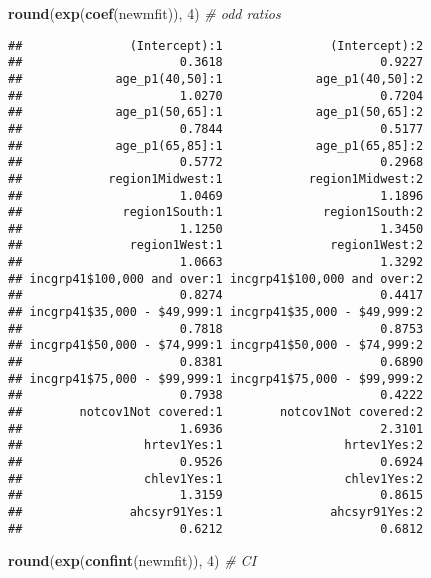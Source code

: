 \documentclass[]{article}
\newenvironment{Shaded}{\begin{snugshade}}{\end{snugshade}}
\newcommand{\CommentTok}[1]{\textcolor[rgb]{0.56,0.35,0.01}{\textit{#1}}}
\newcommand{\DecValTok}[1]{\textcolor[rgb]{0.00,0.00,0.81}{#1}}
\newcommand{\KeywordTok}[1]{\textcolor[rgb]{0.13,0.29,0.53}{\textbf{#1}}}
\newcommand{\NormalTok}[1]{#1}
\begin{document}
\begin{Shaded}
\begin{Highlighting}[]
\KeywordTok{round}\NormalTok{(}\KeywordTok{exp}\NormalTok{(}\KeywordTok{coef}\NormalTok{(newmfit)), }\DecValTok{4}\NormalTok{) }\CommentTok{# odd ratios}
\end{Highlighting}
\end{Shaded}

\begin{verbatim}
##               (Intercept):1               (Intercept):2 
##                      0.3618                      0.9227 
##             age_p1(40,50]:1             age_p1(40,50]:2 
##                      1.0270                      0.7204 
##             age_p1(50,65]:1             age_p1(50,65]:2 
##                      0.7844                      0.5177 
##             age_p1(65,85]:1             age_p1(65,85]:2 
##                      0.5772                      0.2968 
##            region1Midwest:1            region1Midwest:2 
##                      1.0469                      1.1896 
##              region1South:1              region1South:2 
##                      1.1250                      1.3450 
##               region1West:1               region1West:2 
##                      1.0663                      1.3292 
## incgrp41$100,000 and over:1 incgrp41$100,000 and over:2 
##                      0.8274                      0.4417 
## incgrp41$35,000 - $49,999:1 incgrp41$35,000 - $49,999:2 
##                      0.7818                      0.8753 
## incgrp41$50,000 - $74,999:1 incgrp41$50,000 - $74,999:2 
##                      0.8381                      0.6890 
## incgrp41$75,000 - $99,999:1 incgrp41$75,000 - $99,999:2 
##                      0.7938                      0.4222 
##        notcov1Not covered:1        notcov1Not covered:2 
##                      1.6936                      2.3101 
##                 hrtev1Yes:1                 hrtev1Yes:2 
##                      0.9526                      0.6924 
##                 chlev1Yes:1                 chlev1Yes:2 
##                      1.3159                      0.8615 
##               ahcsyr91Yes:1               ahcsyr91Yes:2 
##                      0.6212                      0.6812
\end{verbatim}

\begin{Shaded}
\begin{Highlighting}[]
\KeywordTok{round}\NormalTok{(}\KeywordTok{exp}\NormalTok{(}\KeywordTok{confint}\NormalTok{(newmfit)), }\DecValTok{4}\NormalTok{) }\CommentTok{# CI}
\end{Highlighting}
\end{Shaded}
\end{document}
